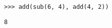 \begin{blocksection}
\question \begin{lstlisting}
>>> add(sub(6, 4), add(4, 2))
\end{lstlisting}

\begin{solution}[0.5in]
\begin{verbatim}
8
\end{verbatim}
\end{solution}
\end{blocksection}
